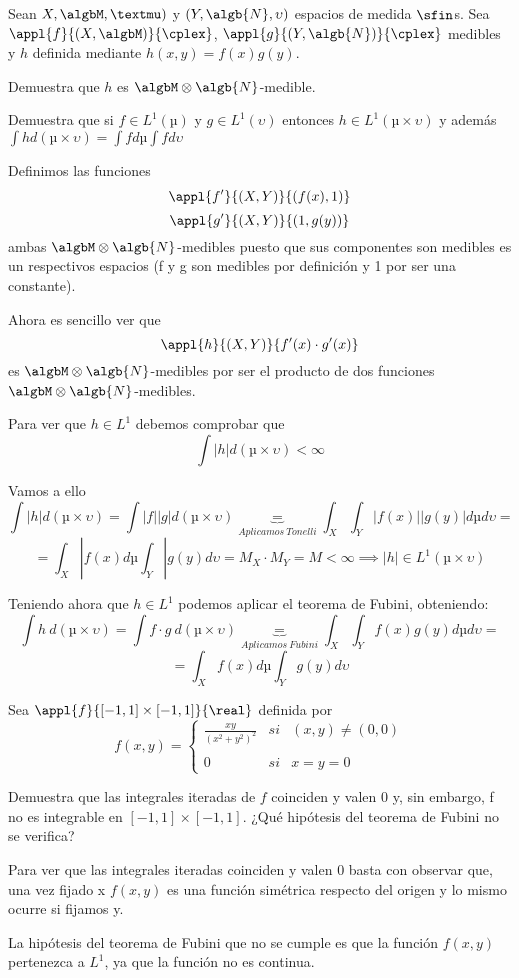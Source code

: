 \begin{problem}[3]
Sean $X, \algbM, µ)$ y $(Y, \algb{N}, \upsilon)$ espacios de medida $\sfin$s. Sea $\appl{f}{(X, \algbM)}{\cplex}$, $\appl{g}{(Y, \algb{N})}{\cplex}$ medibles y $h$ definida mediante $h(x,y)=f(x)g(y)$.

\ppart
Demuestra que $h$ es $\algbM\otimes\algb{N}$-medible.

\ppart
Demuestra que si $f\in L^1(µ)$ y $g \in L^1(\upsilon)$ entonces $h\in L^1(µ \times \upsilon)$ y además $\int hd(µ\times\upsilon)=\int f dµ \int f d\upsilon$

\solution

\spart
Definimos las funciones
\[\appl{f'}{(X,Y)}{(f(x), 1)}\]
\[\appl{g'}{(X,Y)}{(1, g(y))}\]
ambas $\algbM\otimes\algb{N}$-medibles puesto que sus componentes son medibles es un respectivos espacios (f y g son medibles por definición y 1 por ser una constante).

Ahora es sencillo ver que
\[\appl{h}{(X,Y)}{f'(x)\cdot g'(x)}\]
es $\algbM\otimes\algb{N}$-medibles por ser el producto de dos funciones $\algbM\otimes\algb{N}$-medibles.

\spart

Para ver que $h\in L^1$ debemos comprobar que
\[\int |h|d(µ\times\upsilon) < \infty\]

Vamos a ello
\[\int |h|d(µ\times\upsilon) = \int |f||g|d(µ\times \upsilon) \underbrace{=}_{Aplicamos \ Tonelli} \int_X\int_Y |f(x)||g(y)| dµ d\upsilon =\]
\[= \int_X |f(x) dµ \int_Y |g(y) d \upsilon = M_X \cdot M_Y = M < \infty \implies |h| \in L^1(µ\times \upsilon)\]

Teniendo ahora que $h\in L^1$ podemos aplicar el teorema de Fubini, obteniendo:
\[\int h \ d(µ\times\upsilon) = \int f\cdot g \ d(µ\times \upsilon) \underbrace{=}_{Aplicamos \ Fubini} \int_X\int_Y f(x)g(y) dµ d\upsilon =\]
\[= \int_X f(x) dµ \int_Y g(y) d \upsilon \]
\end{problem}

\begin{problem}[4]
Sea $\appl{f}{[-1,1]\times [-1,1]}{\real}$ definida por
\[f(x,y)= \left\{ \begin{array}{lcc}
             \frac{xy}{(x^2+y^2)^2} &  si & (x,y)\neq (0,0) \\
             \\ 0 &  si & x=y=0
             \end{array}
   \right.\]

Demuestra que las integrales iteradas de $f$ coinciden y valen 0 y, sin embargo, f no es integrable en $[-1,1]\times [-1,1]$. ¿Qué hipótesis del teorema de Fubini no se verifica?

\solution
Para ver que las integrales iteradas coinciden y valen 0 basta con observar que, una vez fijado x $f(x,y)$ es una función simétrica respecto del origen y lo mismo ocurre si fijamos y.

La hipótesis del teorema de Fubini que no se cumple es que la función $f(x,y)$ pertenezca a $L^1$, ya que la función no es continua.
\end{problem}